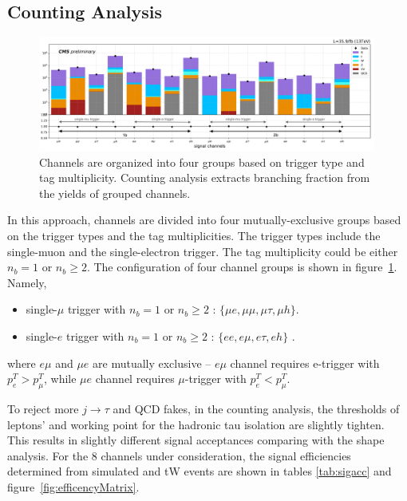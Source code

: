 \FloatBarrier




\subsection{Counting Analysis}


\begin{figure}[htb!]
    \centering
    \includegraphics[width=0.99\textwidth]{chapters/Analysis/sectionStatisticalAnalysis/figures/counting.png}
    \caption{ Channels are organized into four groups based on trigger type and 
    \PQb tag multiplicity. Counting analysis extracts \PW branching fraction from the yields
    of grouped channels.}
    \label{fig:groupsofchannel}
\end{figure}

In this approach, channels are divided into four mutually-exclusive groups based on the trigger types and the \PQb tag multiplicities. 
The trigger types include the single-muon and the single-electron trigger. The \PQb tag multiplicity could be either $n_b=1$ or $n_b \geq 2$.
The configuration of four channel groups is shown in figure~\ref{fig:groupsofchannel}. Namely,

\begin{itemize}
    \item single-$\mu$ trigger with $n_b=1$ or $n_b \geq 2$ : $\big \{ \mu e, \mu\mu, \mu\tau, \mu h \big  \}$.
    \item single-$e$ trigger with $n_b=1$ or $n_b \geq 2$ : $ \big  \{ e e, e\mu, e\tau, e h \big  \}$ .
\end{itemize}


\noindent where $e\mu$ and $\mu e$ are mutually exclusive -- $e\mu$ channel
requires e-trigger with $p^T_e > p^T_\mu$, while $\mu e$ channel
requires $\mu$-trigger with $p^T_e < p^T_\mu$. 




To reject more $j\to \tau$ and QCD fakes, in the counting analysis, the thresholds of leptons' \pt 
and working point for the hadronic tau isolation are slightly tighten. 
This results in slightly different signal
acceptances comparing with the shape analysis. For the 8 channels under consideration, 
the signal efficiencies determined from
simulated \ttbar and tW events are shown in
tables \ref{tab:sigacc} and figure~\ref{fig:efficencyMatrix}. 

